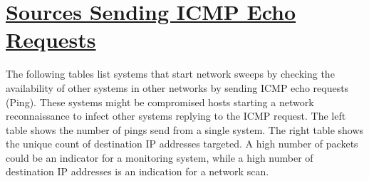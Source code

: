 %
%
%

\chapter[Sources Sending ICMP Echo Requests]{\underline{Sources Sending ICMP Echo Requests}}
\begin{flushleft}
The following tables list systems that start network sweeps by checking the availability of other systems in other networks by sending ICMP echo requests (Ping). These systems might be compromised hosts starting a network reconnaissance to infect other systems replying to the ICMP request. The left table shows the number of pings send from a single system. The right table shows the unique count of destination IP addresses targeted. A high number of packets could be an indicator for a monitoring system, while a high number of destination IP addresses is an indication for a network scan.
\end{flushleft}

